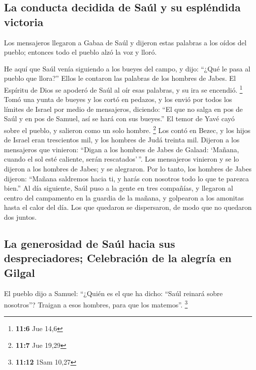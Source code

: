 \begin{paracol}{2}
\hypertarget{la-conducta-decidida-de-sauxfal-y-su-espluxe9ndida-victoria}{%
\subsection{La conducta decidida de Saúl y su espléndida
victoria}\label{la-conducta-decidida-de-sauxfal-y-su-espluxe9ndida-victoria}}

 Los mensajeros llegaron a Gabaa de Saúl y dijeron estas
palabras a los oídos del pueblo; entonces todo el pueblo alzó la voz y
lloró.

 He aquí que Saúl venía siguiendo a los bueyes del campo,
y dijo: ``¿Qué le pasa al pueblo que llora?'' Ellos le contaron las
palabras de los hombres de Jabes.  El Espíritu de Dios se
apoderó de Saúl al oír esas palabras, y su ira se encendió. \footnote{\textbf{11:6}
  Jue 14,6}  Tomó una yunta de bueyes y los cortó en
pedazos, y los envió por todos los límites de Israel por medio de
mensajeros, diciendo: ``El que no salga en pos de Saúl y en pos de
Samuel, así se hará con sus bueyes.'' El temor de Yavé cayó sobre el
pueblo, y salieron como un solo hombre. \footnote{\textbf{11:7} Jue
  19,29}  Los contó en Bezec, y los hijos de Israel eran
trescientos mil, y los hombres de Judá treinta mil. 
Dijeron a los mensajeros que vinieron: ``Digan a los hombres de Jabes de
Galaad: `Mañana, cuando el sol esté caliente, serán rescatados'\,''. Los
mensajeros vinieron y se lo dijeron a los hombres de Jabes; y se
alegraron.  Por lo tanto, los hombres de Jabes dijeron:
``Mañana saldremos hacia ti, y harás con nosotros todo lo que te parezca
bien.''  Al día siguiente, Saúl puso a la gente en tres
compañías, y llegaron al centro del campamento en la guardia de la
mañana, y golpearon a los amonitas hasta el calor del día. Los que
quedaron se dispersaron, de modo que no quedaron dos juntos.

\hypertarget{la-generosidad-de-sauxfal-hacia-sus-despreciadores-celebraciuxf3n-de-la-alegruxeda-en-gilgal}{%
\subsection{La generosidad de Saúl hacia sus despreciadores; Celebración
de la alegría en
Gilgal}\label{la-generosidad-de-sauxfal-hacia-sus-despreciadores-celebraciuxf3n-de-la-alegruxeda-en-gilgal}}

 El pueblo dijo a Samuel: ``¿Quién es el que ha dicho:
``Saúl reinará sobre nosotros''? Traigan a esos hombres, para que los
matemos''. \footnote{\textbf{11:12} 1Sam 10,27}


\end{paracol}
